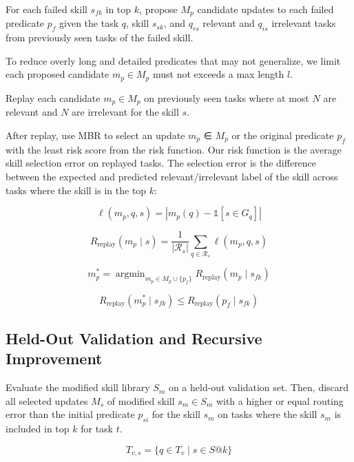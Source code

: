 For each failed skill \(s_{fk}\) in top \(k\), propose \(M_{p}\) candidate updates to each failed predicate \(p_{f}\) given the task \(q\), skill \(s_{sk}\), and \(q_{rs}\) relevant and \(q_{is}\) irrelevant tasks from previously seen tasks of the failed skill.

To reduce overly long and detailed predicates that may not generalize, we limit each proposed candidate \(m_{p} \in M_{p}\) must not exceeds a max length \(l\).

Replay each candidate \(m_{p} \in M_{p}\) on previously seen tasks where at most \(N\) are relevant and \(N\) are irrelevant for the skill \(s\).

After replay, use MBR to select an update \(m_{p}\) ∈ \(M_{p}\) or the original predicate \(p_{f}\) with the least risk score from the risk function. Our risk function is the average skill selection error on replayed tasks. The selection error is the difference between the expected and predicted relevant/irrelevant label of the skill across tasks where the skill is in the top \(k\):

\[\ell(m_p,q,s)=|m_p(q)-\mathds{1}[s\in G_q]|\]

\[R_{\mathrm{replay}}(m_p\mid s)=\frac{1}{|\mathcal{R}_s|}\sum_{q\in\mathcal{R}_s}\ell(m_p,q,s)\]

\[m_p^*=\mathop{\arg\min}_{m_p\in M_p\cup\{p_f\}} R_{\mathrm{replay}}(m_p\mid s_{fk})\]

\[R_{\mathrm{replay}}(m_p^*\mid s_{fk})\leq R_{\mathrm{replay}}(p_f\mid s_{fk})\]

\subsection{Held-Out Validation and Recursive Improvement}

Evaluate the modified skill library \(S_{m}\) on a held-out validation set. Then, discard all selected updates \(M_{s}\) of modified skill \(s_{m} \in S_{m}\) with a higher or equal routing error than the initial predicate \(p_{si}\) for the skill \(s_{m}\) on tasks where the skill \(s_{m}\) is included in top \(k\) for task \(t\).

\[T_{v,s}=\{q\in T_v\mid s\in S@k\}\]

